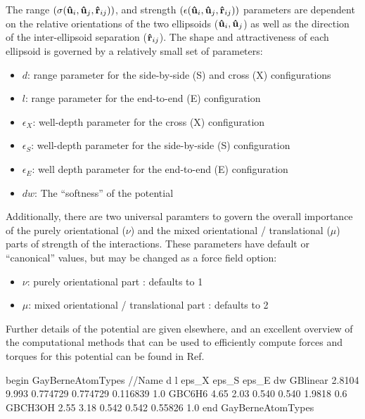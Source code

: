 \documentclass[letterpaper]{report}
\begin{document}
The range $(\sigma({\bf \hat{u}}_{i},{\bf \hat{u}}_{j},{\bf
\hat{r}}_{ij}))$, and strength $(\epsilon({\bf \hat{u}}_{i},{\bf
\hat{u}}_{j},{\bf \hat{r}}_{ij}))$ parameters 
are dependent on the relative orientations of the two ellipsoids (${\bf
\hat{u}}_{i},{\bf \hat{u}}_{j}$) as well as the direction of the
inter-ellipsoid separation (${\bf \hat{r}}_{ij}$).  The shape and
attractiveness of each ellipsoid is governed by a relatively small set
of parameters: 
\begin{itemize}
\item  $d$:  range parameter for the side-by-side (S) and cross (X) configurations
\item  $l$:  range parameter for the end-to-end (E) configuration
\item  $\epsilon_X$:  well-depth parameter for the cross (X) configuration
\item  $\epsilon_S$:  well-depth parameter for the side-by-side (S) configuration
\item  $\epsilon_E$:  well depth parameter for the end-to-end (E) configuration
\item  $dw$: The ``softness'' of the potential
\end{itemize}
Additionally, there are two universal paramters to govern the overall
importance of the purely orientational ($\nu$) and the mixed
orientational / translational ($\mu$) parts of strength of the
interactions.  These parameters have default or ``canonical'' values,
but may be changed as a force field option:
\begin{itemize}
  \item $\nu$: purely orientational part : defaults to 1
  \item $\mu$: mixed orientational / translational part : defaults to
    2
\end{itemize}
Further details of the potential are given
elsewhere,\cite{Luckhurst:1990fy,Golubkov06,SunX._jp0762020} and an
excellent overview of the computational methods that can be used to
efficiently compute forces and torques for this potential can be found
in Ref. 

\begin{code}[caption={[An example of a GayBerneAtomTypes block.] A
simple example of a GayBerneAtomTypes block.  Distances ($d$ and $l$)
are given in \AA\ and energies ($\epsilon_X, \epsilon_S, \epsilon_E$)
are in units of kcal/mol. $dw$ is unitless.},
label={sch:GayBerneAtomTypes}]
begin GayBerneAtomTypes
//Name          d       l       eps_X           eps_S           eps_E     dw
GBlinear        2.8104  9.993   0.774729        0.774729        0.116839  1.0
GBC6H6          4.65    2.03    0.540           0.540           1.9818    0.6
GBCH3OH         2.55    3.18    0.542           0.542           0.55826   1.0
end GayBerneAtomTypes                   
\end{code}
\end{document}
